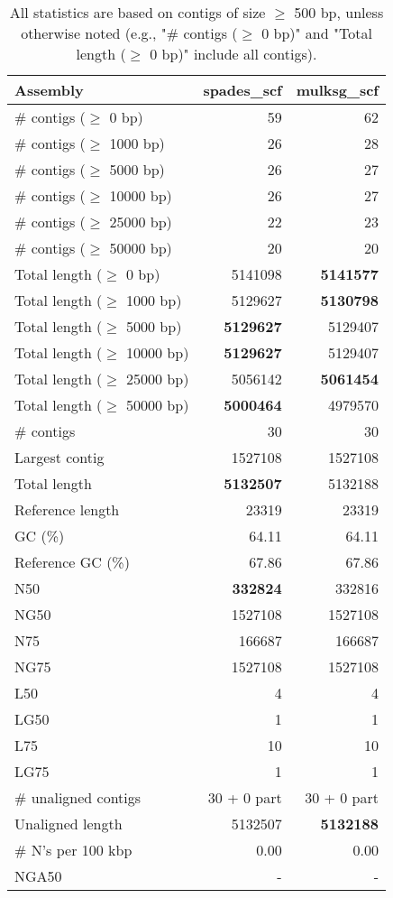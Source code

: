 \documentclass[12pt,a4paper]{article}
\begin{document}
\begin{table}[ht]
\begin{center}
\caption{All statistics are based on contigs of size $\geq$ 500 bp, unless otherwise noted (e.g., "\# contigs ($\geq$ 0 bp)" and "Total length ($\geq$ 0 bp)" include all contigs).}
\begin{tabular}{|l*{2}{|r}|}
\hline
Assembly & spades\_scf & mulksg\_scf \\ \hline
\# contigs ($\geq$ 0 bp) & 59 & 62 \\ \hline
\# contigs ($\geq$ 1000 bp) & 26 & 28 \\ \hline
\# contigs ($\geq$ 5000 bp) & 26 & 27 \\ \hline
\# contigs ($\geq$ 10000 bp) & 26 & 27 \\ \hline
\# contigs ($\geq$ 25000 bp) & 22 & 23 \\ \hline
\# contigs ($\geq$ 50000 bp) & 20 & 20 \\ \hline
Total length ($\geq$ 0 bp) & 5141098 & {\bf 5141577} \\ \hline
Total length ($\geq$ 1000 bp) & 5129627 & {\bf 5130798} \\ \hline
Total length ($\geq$ 5000 bp) & {\bf 5129627} & 5129407 \\ \hline
Total length ($\geq$ 10000 bp) & {\bf 5129627} & 5129407 \\ \hline
Total length ($\geq$ 25000 bp) & 5056142 & {\bf 5061454} \\ \hline
Total length ($\geq$ 50000 bp) & {\bf 5000464} & 4979570 \\ \hline
\# contigs & 30 & 30 \\ \hline
Largest contig & 1527108 & 1527108 \\ \hline
Total length & {\bf 5132507} & 5132188 \\ \hline
Reference length & 23319 & 23319 \\ \hline
GC (\%) & 64.11 & 64.11 \\ \hline
Reference GC (\%) & 67.86 & 67.86 \\ \hline
N50 & {\bf 332824} & 332816 \\ \hline
NG50 & 1527108 & 1527108 \\ \hline
N75 & 166687 & 166687 \\ \hline
NG75 & 1527108 & 1527108 \\ \hline
L50 & 4 & 4 \\ \hline
LG50 & 1 & 1 \\ \hline
L75 & 10 & 10 \\ \hline
LG75 & 1 & 1 \\ \hline
\# unaligned contigs & 30 + 0 part & 30 + 0 part \\ \hline
Unaligned length & 5132507 & {\bf 5132188} \\ \hline
\# N's per 100 kbp & 0.00 & 0.00 \\ \hline
NGA50 & - & - \\ \hline
\end{tabular}
\end{center}
\end{table}
\end{document}
